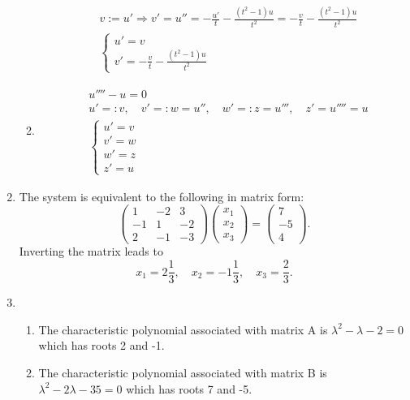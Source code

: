 \documentclass[a4paper,12pt,leqno]{article}
\begin{document}
\begin{enumerate}
\begin{enumerate}
\begin{align*}
& v:= u' \Rightarrow v' = u'' = -\frac{u'}{t} - \frac{(t^2 -1)u}{t^2} = -\frac{v}{t} - \frac{(t^2 -1)u}{t^2} \\
& \begin{cases}
u' = v\\
v' = -\frac{v}{t} - \frac{(t^2 -1)u}{t^2}
\end{cases}
\end{align*}
\item \begin{align*}
& u'''' - u = 0 \\
& u' =:v,\quad v'=:w=u'',\quad w'=:z=u''',\quad z'=u''''=u \\
&\begin{cases}
u' = v\\
v' = w\\
w' = z\\
z' = u
\end{cases}
\end{align*}
\end{enumerate}
\item The system is equivalent to the following in matrix form:
\[ \begin{pmatrix}
1 & -2 & 3 \\
-1 & 1 & -2 \\
2 & -1 & -3 
\end{pmatrix}
\begin{pmatrix}
x_1 \\
x_2 \\
x_3
\end{pmatrix}
= 
\begin{pmatrix}
7 \\
-5 \\
4
\end{pmatrix}. \]
Inverting the matrix leads to 
\[ x_1 = 2\dfrac{1}{3}, \quad x_2 = -1 \dfrac{1}{3}, \quad x_3 = \dfrac{2}{3}. \]
\item \begin{enumerate}
\item The characteristic polynomial associated with matrix A is $\lambda^2 - \lambda - 2 = 0$ which has roots 2 and -1.
\item The characteristic polynomial associated with matrix B is $\lambda^2 - 2 \lambda - 35 = 0$ which has roots 7 and -5.
\end{enumerate}
\end{enumerate}
\end{document}
